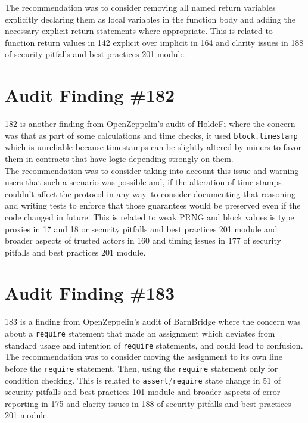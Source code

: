 The recommendation was to consider removing all named return variables explicitly declaring them as local variables in the function body and adding the necessary explicit return statements where appropriate. This is related to function return values in 142 explicit over implicit in 164 and clarity issues in 188 of security pitfalls and best practices 201 module.

\section{Audit Finding \#182}

182 is another finding from OpenZeppelin's audit of HoldeFi where the concern was that as part of some calculations and time checks, it used \verb|block.timestamp| which is unreliable because timestamps can be slightly altered by miners to favor them in contracts that have logic depending strongly on them.\\

The recommendation was to consider taking into account this issue and warning users that such a scenario was possible and, if the alteration of time stamps couldn't affect the protocol in any way. to consider documenting that reasoning and writing tests to enforce that those guarantees would be preserved even if the code changed in future. This is related to weak PRNG and block values is type proxies in 17 and 18 or security pitfalls and best practices 201 module and broader aspects of trusted actors in 160 and timing issues in 177 of security pitfalls and best practices 201 module.

\section{Audit Finding \#183}

183 is a finding from OpenZeppelin's audit of BarnBridge where the concern was about a \verb|require| statement that made an assignment which deviates from standard usage and intention of \verb|require| statements, and could lead to confusion.\\

The recommendation was to consider moving the assignment to its own line before the \verb|require| statement. Then, using the \verb|require| statement only for condition checking. This is related to \verb|assert|/\verb|require| state change in 51 of security pitfalls and best practices 101 module and broader aspects of error reporting in 175 and clarity issues in 188 of security pitfalls and best practices 201 module.

